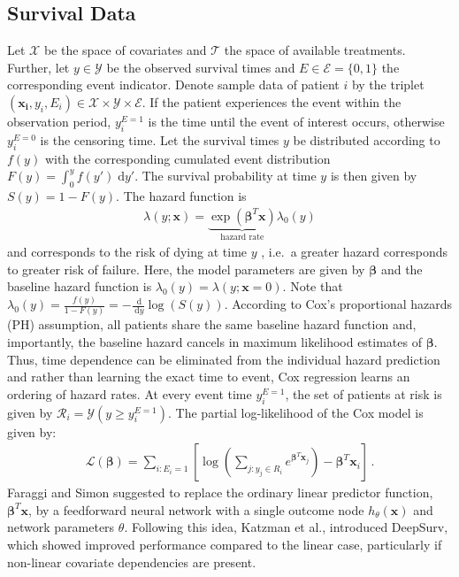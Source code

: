 \documentclass{article}
\newcommand{\myvec}[1]{\boldsymbol{#1}}
\renewcommand{\d}{\;\mathrm{d}}
\begin{document}
	\subsection{Survival Data}
	Let $\mathcal{X}$ be the space of covariates and $\mathcal{T}$ the space of available treatments. Further, let $y\in\mathcal{Y}$ be the observed survival times and $E\in\mathcal{E}=\{0,1\}$ the corresponding event indicator.
	Denote sample data of patient $i$ by the triplet $(\myvec{x_i},y_i,E_i)\in\mathcal{X}\times\mathcal{Y}\times\mathcal{E}$.
	If the patient experiences the event within the observation period, $y_i^{E=1}$ is the time until the event of interest occurs, otherwise $y_i^{E=0}$ is the censoring time.
	Let the survival times $y$ be distributed according to $f(y)$ with the corresponding cumulated event distribution $F(y)=\int_{0}^{y}f(y') \d y'$. The survival probability at time $y$ is then given by $S(y)=1-F(y)$. The hazard function is 
	\begin{align*}
	\lambda(y;\myvec{x})=\underbrace{\exp(\myvec{\beta}^T\myvec{x})}_{\text{hazard rate}}\lambda_0(y)
	\end{align*}
	and corresponds to the risk of dying at time $y$ \cite{Cox.1972}, i.e.~a greater hazard corresponds to greater risk of failure. Here, the model parameters are given by $\myvec{\beta}$ and the baseline hazard function is $\lambda_0(y) = \lambda(y;\myvec{x}=0)$. Note that $\lambda_0(y) = \frac{f(y)}{1-F(y)}=-\frac{\d}{\d y}\log (S(y))$. According to Cox's proportional hazards (PH) assumption, all patients share the same baseline hazard function and, importantly, the baseline hazard cancels in maximum likelihood estimates of $\myvec{\beta}$. Thus, time dependence can be eliminated from the individual hazard prediction and rather than learning the exact time to event, Cox regression learns an ordering of hazard rates. At every event time $y^{E=1}_i$, the set of patients at risk is given by $\mathcal{R}_i=\mathcal{Y}(y\geq y^{E=1}_i)$. The partial log-likelihood of the Cox model \cite{Cox.1972,Breslow.1972}  is given by: 
	\begin{align}
	\mathcal{L}(\myvec{\beta})=\sum_{i:E_i=1}\left[\log\left(\sum_{j:y_j\in R_i}e^{\myvec{\beta}^T\myvec{x}_j}\right)-\myvec{\beta}^T\myvec{x}_i\right]\,. \label{eq:cox_reg}
	\end{align}
	Faraggi and Simon  suggested to replace the ordinary linear predictor function, $\myvec{\beta}^T\myvec{x}$, by a feedforward neural network with a single outcome node $h_\theta(\myvec{x})$ and network parameters $\theta$. Following this idea, Katzman et al.,  introduced DeepSurv, which showed improved performance compared to the linear case, particularly if non-linear covariate dependencies are present. 
	
\end{document}
